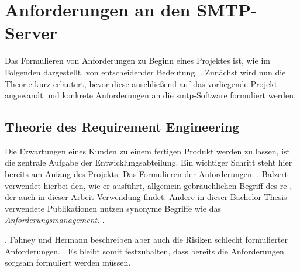 \chapter{Anforderungen an den SMTP-Server}
\label{sec:Anforderung}
Das Formulieren von Anforderungen zu Beginn eines Projektes ist, wie im Folgenden dargestellt, von entscheidender Bedeutung.  \citep[][77]{Hull2010}. Zunächst wird nun die Theorie kurz erläutert, bevor diese anschließend auf das vorliegende Projekt angewandt und konkrete Anforderungen an die \ac{smtp}-Software formuliert werden.

\section{Theorie des Requirement Engineering}


Die Erwartungen eines Kunden zu einem fertigen Produkt werden zu lassen, ist die zentrale Aufgabe der Entwicklungsabteilung. Ein wichtiger Schritt steht hier bereits am Anfang des Projekts: Das Formulieren der Anforderungen.
 \citep[][434]{Balzert2010}. 
Balzert verwendet hierbei den, wie er ausführt, allgemein gebräuchlichen Begriff des \acf{re} \citep[vgl.][434]{Balzert2010}, der auch in dieser Arbeit Verwendung findet. Andere in dieser Bachelor-Thesis verwendete Publikationen nutzen  synonyme Begriffe wie \zb das \textit{Anforderungsmanagement}.
 \citep[][6]{Grande2014}.

 \citep[Fahney und Hermann in][10]{Herrmann2013}.
Fahney und Hermann beschreiben aber auch die Risiken schlecht formulierter Anforderungen.  \citep[Fahney und Hermann in][10]{Herrmann2013}. 
Es bleibt somit festzuhalten, dass bereits die Anforderungen sorgsam formuliert werden müssen.

